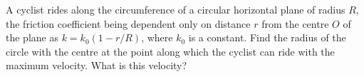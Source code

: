 \item A cyclist rides along the circumference of a circular horizontal plane of radius \(R\), the friction coefficient being dependent only on distance \(r\) from the centre \(O\) of the plane as \( k = k_0 (1 - r/R) \), where \( k_0 \) is a constant. Find the radius of the circle with the centre at the point along which the cyclist can ride with the maximum velocity. What is this velocity?
    \begin{center}
    \end{center}
